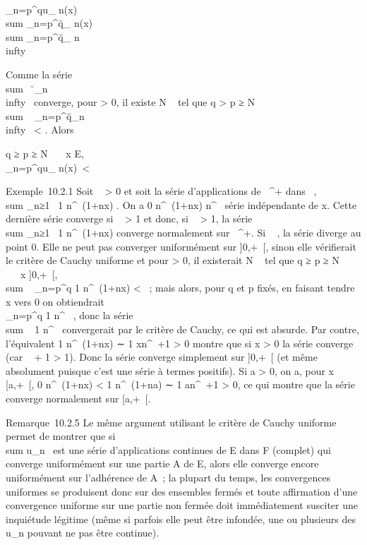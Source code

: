 \documentclass[]{article}
\begin{document}
\\\sum
_n=p^qu_ n(x)\
\leq\\sum
_n=p^q\u_
n(x)\ \leq\\sum
_n=p^q\u_
n\\infty~

Comme la série \\sum ~
\u_n\\infty~
converge, pour \epsilon > 0, il existe N \in {}~ tel que q
> p ≥ N
\rigtharrow~\\sum ~
_n=p^q\u_n\\infty~
< \epsilon. Alors

q ≥ p ≥ N \rigtharrow~\forall~~x \in E,
\\\sum
_n=p^qu_ n(x)\
< \epsilon

Exemple~10.2.1 Soit \alpha~ > 0 et soit la série d'applications
de ~^+ dans ~,
\\sum  _n≥1~ 1
\over n^\alpha~(1+nx) . On a 0 
\over n^\alpha~(1+nx)  \over
n^\alpha~ série indépendante de x. Cette dernière série converge
si \alpha~ > 1 et donc, si \alpha~ > 1, la série
\\sum  _n≥1~ 1
\over n^\alpha~(1+nx) converge normalement sur
~^+. Si \alpha~ , la série diverge au point 0. Elle ne peut pas
converger uniformément sur ]0,+\infty~[, sinon elle vérifierait le critère
de Cauchy uniforme et pour \epsilon > 0, il existerait N \in \mathbb{N}~ tel
que q ≥ p ≥ N \rigtharrow~\forall~~x \in]0,+\infty~[,
\\sum ~
_n=p^q 1 \over n^\alpha~(1+nx)
< \epsilon~; mais alors, pour q et p fixés, en faisant tendre x vers
0 on obtiendrait \\\sum
 _n=p^q 1 \over n^\alpha~ \leq \epsilon,
donc la série \\sum ~ 
1 \over n^\alpha~ convergerait par le critère de
Cauchy, ce qui est absurde. Par contre, l'équivalent  1
\over n^\alpha~(1+nx) ∼ 1 \over
xn^\alpha~+1 > 0 montre que si x > 0 la
série converge (car \alpha~ + 1 > 1). Donc la série converge
simplement sur ]0,+\infty~[ (et même absolument puisque c'est une série à
termes positifs). Si a > 0, on a, pour x \in [a,+\infty~[, 0
\leq 1 \over n^\alpha~(1+nx) < 1
\over n^\alpha~(1+na) ∼ 1 \over
an^\alpha~+1 > 0, ce qui montre que la série
converge normalement sur [a,+\infty~[.

Remarque~10.2.5 Le même argument utilisant le critère de Cauchy uniforme
permet de montrer que si
\\sum  u_n~ est
une série d'applications continues de E dans F (complet) qui converge
uniformément sur une partie A de E, alors elle converge encore
uniformément sur l'adhérence \overlineA de A~; la
plupart du temps, les convergences uniformes se produisent donc sur des
ensembles fermés et toute affirmation d'une convergence uniforme sur une
partie non fermée doit immédiatement susciter une inquiétude légitime
(même si parfois elle peut être infondée, une ou plusieurs des
u_n pouvant ne pas être continue).
\end{document}
